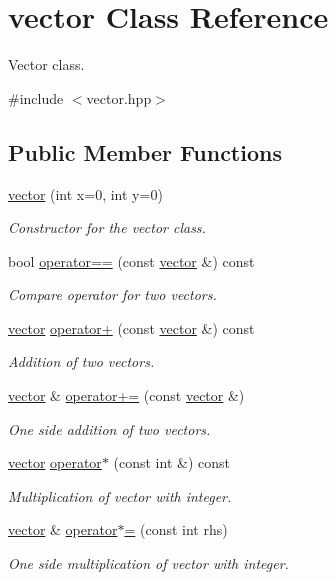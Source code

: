 \hypertarget{classvector}{}\section{vector Class Reference}
\label{classvector}


Vector class.  




{\ttfamily \#include $<$vector.\+hpp$>$}

\subsection*{Public Member Functions}
\begin{DoxyCompactItemize}
\item 
\hyperlink{classvector_ada69c108ec9393e6f70bdfcd58366cbf}{vector} (int x=0, int y=0)
\begin{DoxyCompactList}\small\item\em Constructor for the vector class. \end{DoxyCompactList}\item 
bool \hyperlink{classvector_a14470a2d43b26c15f0f7aaeeb6ae4f04}{operator==} (const \hyperlink{classvector}{vector} \&) const
\begin{DoxyCompactList}\small\item\em Compare operator for two vectors. \end{DoxyCompactList}\item 
\hyperlink{classvector}{vector} \hyperlink{classvector_a25f3bec51c3c238f516d6efc12a83ddc}{operator+} (const \hyperlink{classvector}{vector} \&) const
\begin{DoxyCompactList}\small\item\em Addition of two vectors. \end{DoxyCompactList}\item 
\hyperlink{classvector}{vector} \& \hyperlink{classvector_aaf697df4ba3936748875757f0e0ce62a}{operator+=} (const \hyperlink{classvector}{vector} \&)
\begin{DoxyCompactList}\small\item\em One side addition of two vectors. \end{DoxyCompactList}\item 
\hyperlink{classvector}{vector} \hyperlink{classvector_a45eb0f7dc223ac58649ab466d961c547}{operator$\ast$} (const int \&) const
\begin{DoxyCompactList}\small\item\em Multiplication of vector with integer. \end{DoxyCompactList}\item 
\hyperlink{classvector}{vector} \& \hyperlink{classvector_ad1d720c7cd340d051ff39a31f95995f7}{operator$\ast$=} (const int rhs)
\begin{DoxyCompactList}\small\item\em One side multiplication of vector with integer. \end{DoxyCompactList}\end{DoxyCompactItemize}
